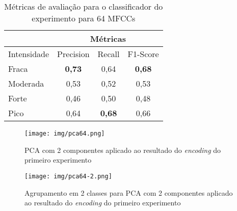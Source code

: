 \begin{table}%
    \centering
    \begin{tabular}{l|ccc|}
        \cline{2-4}
                                      & \multicolumn{3}{c|}{Métricas}                                                               \\ \hline
            \multicolumn{1}{|l|}{Intensidade} & \multicolumn{1}{c|}{Precision}      & \multicolumn{1}{c|}{Recall}           & F1-Score      \\ \hline
            \multicolumn{1}{|l|}{Fraca}       & \multicolumn{1}{c|}{\textbf{0,73}}  & \multicolumn{1}{c|}{0,64}             & \textbf{0,68} \\ \hline
            \multicolumn{1}{|l|}{Moderada}    & \multicolumn{1}{c|}{0,53}           & \multicolumn{1}{c|}{0,52}             & 0,53          \\ \hline
            \multicolumn{1}{|l|}{Forte}       & \multicolumn{1}{c|}{0,46}           & \multicolumn{1}{c|}{0,50}              & 0,48          \\ \hline
            \multicolumn{1}{|l|}{Pico}        & \multicolumn{1}{c|}{0,64}           & \multicolumn{1}{c|}{\textbf{0,68}}    & 0,66          \\ \hline
        \end{tabular}
    \caption{\label{table:metricasclf64}Métricas de avaliação para o classificador do experimento para 64 \acrshort{MFCC}s}
\end{table}

\begin{figure}%
    \centering
    \texttt{[image: img/pca64.png]}
    \caption{\label{fig:pca64}\acrshort{PCA} com 2 componentes aplicado ao resultado do \textit{encoding} do primeiro experimento}
\end{figure}

\begin{figure}%
    \centering
    \texttt{[image: img/pca64-2.png]}
    \caption{\label{fig:pca64-2}Agrupamento em 2 classes para \acrshort{PCA} com 2 componentes aplicado ao resultado do \textit{encoding} do primeiro experimento}
\end{figure}
